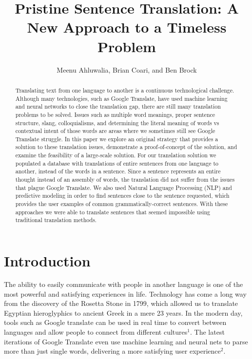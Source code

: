 \documentclass{llncs}
\title{Pristine Sentence Translation: A New Approach to a Timeless Problem}
\author{
  Meenu Ahluwalia, Brian Coari, and Ben Brock
}
\institute{$^1$Master of Science in Data Science \\ Southern Methodist University \\ Dallas, Texas USA \\
\email{\{mahluwalia, bcoari, bbrock\}@smu.edu}}
\begin{document}
\maketitle

\begin{abstract}
Translating text from one language to another is a continuous technological challenge. Although many technologies, such as Google Translate, have used machine learning and neural networks to close the translation gap, there are still many translation problems to be solved. Issues such as multiple word meanings, proper sentence structure, slang, colloquialisms, and determining the literal meaning of words vs contextual intent of those words are areas where we sometimes still see Google Translate struggle. In this paper we explore an original strategy that provides a solution to these translation issues, demonstrate a proof-of-concept of the solution, and examine the feasibility of a large-scale solution. For our translation solution we populated a database with translations of entire sentences from one language to another, instead of the words in a sentence. Since a sentence represents an entire thought instead of an assembly of words, the translation did not suffer from the issues that plague Google Translate. We also used Natural Language Processing (NLP) and predictive modeling in order to find sentences close to the sentence requested, which provides the user examples of common grammatically-correct sentences. With these approaches we were able to translate sentences that seemed impossible using traditional translation methods.

\end{abstract}


\section{Introduction}

The ability to easily communicate with people in another language is one of the most powerful and satisfying experiences in life. Technology has come a long way from the discovery of the Rosetta Stone in 1799, which allowed us to translate Egyptian hieroglyphics to ancient Greek in a mere 23 years. In the modern day, tools such as Google translate can be used in real time to convert between languages and allow people to connect from different cultures$^1$. The latest iterations of Google Translate even use machine learning and neural nets to parse more than just  single words, delivering a more satisfying user experience$^2$.
\end{document}
